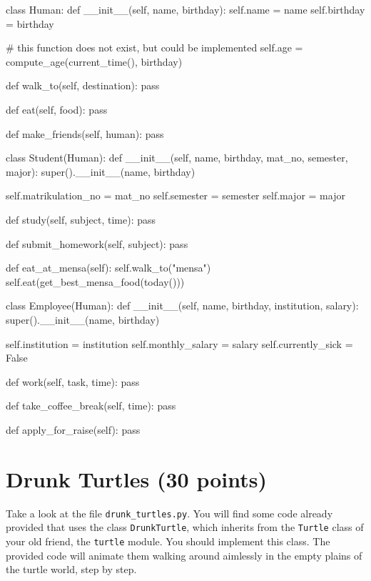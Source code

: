 \begin{solution}
    \begin{pythoncode}
class Human:
    def __init__(self, name, birthday):
        self.name = name
        self.birthday = birthday

        # this function does not exist, but could be implemented
        self.age = compute_age(current_time(), birthday)

    def walk_to(self, destination):
        pass

    def eat(self, food):
        pass

    def make_friends(self, human):
        pass

class Student(Human):
    def __init__(self, name, birthday, mat_no, semester, major):
        super().__init__(name, birthday)

        self.matrikulation_no = mat_no
        self.semester = semester
        self.major = major

    def study(self, subject, time):
        pass

    def submit_homework(self, subject):
        pass

    def eat_at_mensa(self):
        self.walk_to("mensa")
        self.eat(get_best_mensa_food(today()))

class Employee(Human):
    def __init__(self, name, birthday, institution, salary):
        super().__init__(name, birthday)

        self.institution = institution
        self.monthly_salary = salary
        self.currently_sick = False

    def work(self, task, time):
        pass

    def take_coffee_break(self, time):
        pass

    def apply_for_raise(self):
        pass
    \end{pythoncode}
\end{solution}




\section{Drunk Turtles (30 points)}

Take a look at the file {\tt drunk\_turtles.py}. You will find some code already provided that uses the class {\tt DrunkTurtle}, which inherits from the {\tt Turtle} class of your old friend, the {\tt turtle} module. You should implement this class. The provided code will animate them walking around aimlessly in the empty plains of the turtle world, step by step.

